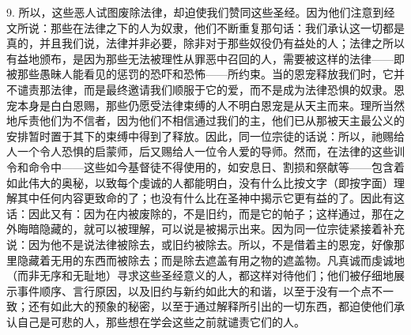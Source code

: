 9. 所以，这些恶人试图废除法律，却迫使我们赞同这些圣经。因为他们注意到经文所说：那些在法律之下的人为奴隶，他们不断重复那句话：我们承认这一切都是真的，并且我们说，法律并非必要，除非对于那些奴役仍有益处的人；法律之所以有益地颁布，是因为那些无法被理性从罪恶中召回的人，需要被这样的法律——即被那些愚昧人能看见的惩罚的恐吓和恐怖——所约束。当的恩宠释放我们时，它并不谴责那法律，而是最终邀请我们顺服于它的爱，而不是成为法律恐惧的奴隶。恩宠本身是白白恩赐，那些仍愿受法律束缚的人不明白恩宠是从天主而来。理所当然地斥责他们为不信者，因为他们不相信通过我们的主，他们已从那被天主最公义的安排暂时置于其下的束缚中得到了释放。因此，同一位宗徒的话说：所以，祂赐给人一个令人恐惧的启蒙师，后又赐给人一位令人爱的导师。然而，在法律的这些训令和命令中——这些如今基督徒不得使用的，如安息日、割损和祭献等——包含着如此伟大的奥秘，以致每个虔诚的人都能明白，没有什么比按文字（即按字面）理解其中任何内容更致命的了；也没有什么比在圣神中揭示它更有益的了。因此有这话：因此又有：因为在内被废除的，不是旧约，而是它的帕子；这样通过，那在之外晦暗隐藏的，就可以被理解，可以说是被揭示出来。因为同一位宗徒紧接着补充说：因为他不是说法律被除去，或旧约被除去。所以，不是借着主的恩宠，好像那里隐藏着无用的东西而被除去；而是除去遮盖有用之物的遮盖物。凡真诚而虔诚地（而非无序和无耻地）寻求这些圣经意义的人，都这样对待他们；他们被仔细地展示事件顺序、言行原因，以及旧约与新约如此大的和谐，以至于没有一个点不一致；还有如此大的预象的秘密，以至于通过解释所引出的一切东西，都迫使他们承认自己是可悲的人，那些想在学会这些之前就谴责它们的人。\par

